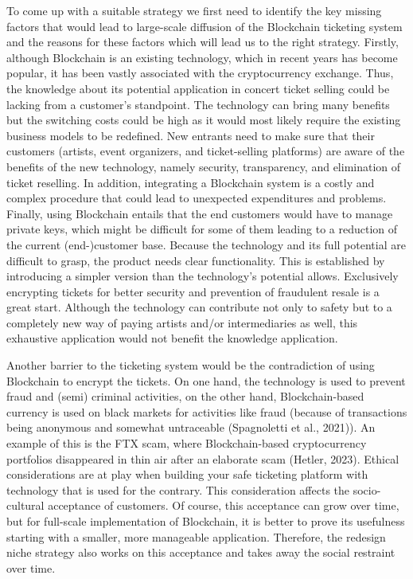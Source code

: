 \documentclass[a4paper,8pt,UTF8]{scrartcl}
\begin{document}
To come up with a suitable strategy we first need to identify the key missing factors that would lead to large-scale diffusion of the Blockchain ticketing system and the reasons for these factors which will lead us to the right strategy.
Firstly, although Blockchain is an existing technology,
 which in recent years has become popular, it has been vastly associated with the cryptocurrency exchange. 
Thus, the knowledge about its potential application in concert ticket selling could be lacking from a customer's standpoint. 
The technology can bring many benefits but the switching costs could be high as it would most likely require the existing business models to be redefined. New entrants need to make sure that their customers (artists, event organizers, and ticket-selling platforms) are aware of the benefits of the new technology, namely security, transparency, and elimination of ticket reselling. In addition, integrating a Blockchain system is a costly and complex procedure that could lead to unexpected expenditures and problems. Finally, using Blockchain entails that the end customers would have to manage private keys, which might be difficult for some of them leading to a reduction of the current (end-)customer base. Because the technology and its full potential are difficult to grasp, the product needs clear functionality. This is established by introducing a simpler version than the technology’s potential allows. Exclusively encrypting tickets for better security and prevention of fraudulent resale is a great start. Although the technology can contribute not only to safety but to a completely new way of paying artists and/or intermediaries as well, this exhaustive application would not benefit the knowledge application. 

Another barrier to the ticketing system would be the contradiction of using Blockchain to encrypt the tickets. On one hand, the technology is used to prevent fraud and (semi) criminal activities, on the other hand, Blockchain-based currency is used on black markets for activities like fraud (because of transactions being anonymous and somewhat untraceable (Spagnoletti et al., 2021)\cite{spagnoletti2021online}). An example of this is the FTX scam, where Blockchain-based cryptocurrency portfolios disappeared in thin air after an elaborate scam (Hetler, 2023)\cite{techtarget2023}. Ethical considerations are at play when building your safe ticketing platform with technology that is used for the contrary. This consideration affects the socio-cultural acceptance of customers. Of course, this acceptance can grow over time, but for full-scale implementation of Blockchain, it is better to prove its usefulness starting with a smaller, more manageable application. Therefore, the redesign niche strategy also works on this acceptance and takes away the social restraint over time. 
\end{document}
